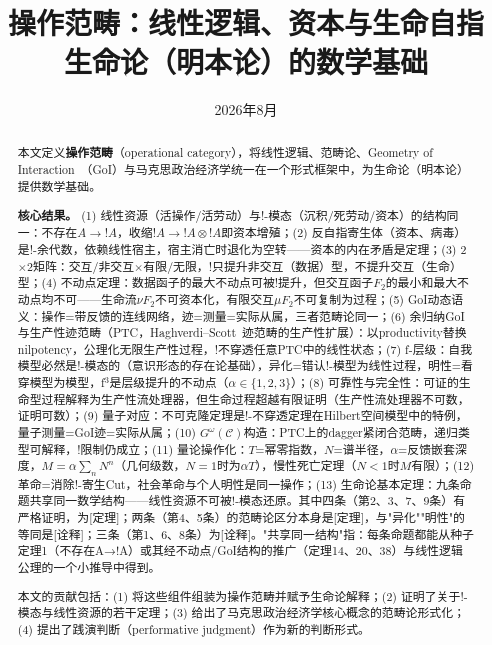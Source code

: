 \documentclass[11pt,a4paper]{article}
\title{\textbf{操作范畴：线性逻辑、资本与生命自指}\\[6pt]
\large 生命论（明本论）的数学基础}
\author{}
\date{2026年8月}
\newcommand{\bang}{{!}}
\newcommand{\tensor}{\otimes}
\begin{document}
\maketitle

\begin{abstract}
本文定义\textbf{操作范畴}（operational category），将线性逻辑、范畴论、Geometry of Interaction~\cite{girard89}（GoI）与马克思政治经济学统一在一个形式框架中，为生命论（明本论）提供数学基础。

\textbf{核心结果。} (1) 线性资源（活操作/活劳动）与$\bang$-模态（沉积/死劳动/资本）的结构同一：不存在$A\to\bang A$，收缩$\bang A\to\bang A\tensor\bang A$即资本增殖；(2) 反自指寄生体（资本、病毒）是$\bang$-余代数，依赖线性宿主，宿主消亡时退化为空转——资本的内在矛盾是定理；(3) 2$\times$2矩阵：交互/非交互$\times$有限/无限，$\bang$只提升非交互（数据）型，不提升交互（生命）型；(4) 不动点定理：数据函子的最大不动点可被$\bang$提升，但交互函子$F_2$的最小和最大不动点均不可——生命流$\nu F_2$不可资本化，有限交互$\mu F_2$不可复制为过程；(5) GoI动态语义：操作=带反馈的连线网络，迹=测量=实际从属，三者范畴论同一；(6) 余归纳GoI与生产性迹范畴（PTC，Haghverdi--Scott~\cite{haghverdi06}迹范畴的生产性扩展）：以productivity替换nilpotency，公理化无限生产性过程，$\bang$不穿透任意PTC中的线性状态；(7) f-层级：自我模型必然是$\bang$-模态的（意识形态的存在论基础），异化=错认$\bang$-模型为线性过程，明性=看穿模型为模型，f$^3$是层级提升的不动点（$\alpha\in\{1,2,3\}$）；(8) 可靠性与完全性：可证的生命型过程解释为生产性流处理器，但生命过程超越有限证明（生产性流处理器不可数，证明可数）；(9) 量子对应：不可克隆定理是$\bang$-不穿透定理在Hilbert空间模型中的特例，量子测量=GoI迹=实际从属；(10) $G^\omega(\mathcal{C})$构造：PTC上的dagger紧闭合范畴，递归类型可解释，$\bang$限制仍成立；(11) 量论操作化：$T$=幂零指数，$N$=谱半径，$\alpha$=反馈嵌套深度，$M=\alpha\sum_{n}N^n$（几何级数，$N=1$时为$\alpha T$），慢性死亡定理（$N<1$时$M$有限）；(12) 革命=消除$\bang$-寄生Cut，社会革命与个人明性是同一操作；(13) 生命论基本定理：九条命题共享同一数学结构——线性资源不可被!-模态还原。其中四条（第2、3、7、9条）有严格证明，为[定理]；两条（第4、5条）的范畴论区分本身是[定理]，与"异化""明性"的等同是[诠释]；三条（第1、6、8条）为[诠释]。"共享同一结构"指：每条命题都能从种子定理1（不存在A→!A）或其经不动点/GoI结构的推广（定理14、20、38）与线性逻辑公理的一个小推导中得到。

本文的贡献包括：(1) 将这些组件组装为操作范畴并赋予生命论解释；(2) 证明了关于$\bang$-模态与线性资源的若干定理；(3) 给出了马克思政治经济学核心概念的范畴论形式化；(4) 提出了践演判断（performative judgment）作为新的判断形式。
\end{abstract}
\end{document}

